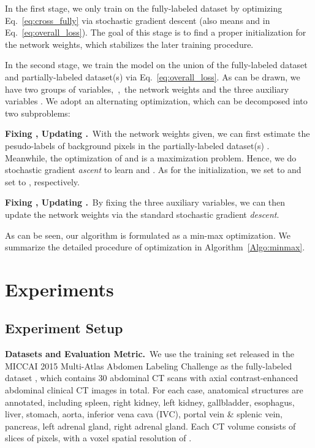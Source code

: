 \documentclass[10pt,twocolumn,letterpaper]{article}
\begin{document}
In the first stage, we only train on the fully-labeled dataset  by optimizing Eq.~\eqref{eq:cross_fully} via stochastic gradient descent (also means  and  in Eq.~\eqref{eq:overall_loss}). The goal of this stage is to find a proper initialization  for the network weights, which stabilizes the later training procedure. 

In the second stage, we train the model on the union of the fully-labeled dataset  and partially-labeled dataset(s)  via Eq.~\eqref{eq:overall_loss}. As can be drawn, we have two groups of variables,~\ie,~the network weights  and the three auxiliary variables . We adopt an alternating optimization, which can be decomposed into two subproblems:

    \vspace{1ex}\noindent\textbf{ Fixing , Updating .}~With the network weights  given, we can first estimate the pesudo-labels  of background pixels in the partially-labeled dataset(s) . 
    Meanwhile, the optimization of  and  is a maximization problem. Hence, we do stochastic gradient {\it ascent} to learn  and . As for the initialization, we set  to  and set  to , respectively.
    
    \vspace{1ex}\noindent\textbf{ Fixing , Updating .}~By fixing the three auxiliary variables, we can then update the network weights  via the standard stochastic gradient {\it descent}.



As can be seen, our algorithm is formulated as a min-max optimization. We summarize the detailed procedure of optimization in Algorithm~\ref{Algo:minmax}.



\section{Experiments}
\subsection{Experiment Setup}
\noindent\textbf{Datasets and Evaluation Metric.}~We use the training set released in the MICCAI 2015 Multi-Atlas Abdomen Labeling Challenge as the fully-labeled dataset , which contains 30 abdominal CT scans with  axial contrast-enhanced abdominal clinical CT images in total. For each case,  anatomical structures are annotated, including spleen, right kidney, left kidney, gallbladder, esophagus, liver, stomach, aorta, inferior vena cava (IVC), portal vein \& splenic vein, pancreas, left adrenal gland, right adrenal gland. Each CT volume consists of  slices of  pixels, with a voxel spatial resolution of .
\end{document}
